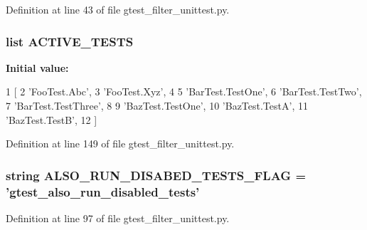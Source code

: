 \-Definition at line 43 of file gtest\-\_\-filter\-\_\-unittest.\-py.

\hypertarget{namespacegtest__filter__unittest_a10a0fc6f90e8342edb66ea225cee9164}{
\subsubsection[{\-A\-C\-T\-I\-V\-E\-\_\-\-T\-E\-S\-T\-S}]{\setlength{\rightskip}{0pt plus 5cm}list {\bf \-A\-C\-T\-I\-V\-E\-\_\-\-T\-E\-S\-T\-S}}}\label{d5/dea/namespacegtest__filter__unittest_a10a0fc6f90e8342edb66ea225cee9164}
{\bfseries \-Initial value\-:}
\begin{DoxyCode}
1 [
2     'FooTest.Abc',
3     'FooTest.Xyz',
4 
5     'BarTest.TestOne',
6     'BarTest.TestTwo',
7     'BarTest.TestThree',
8 
9     'BazTest.TestOne',
10     'BazTest.TestA',
11     'BazTest.TestB',
12     ]
\end{DoxyCode}


\-Definition at line 149 of file gtest\-\_\-filter\-\_\-unittest.\-py.

\hypertarget{namespacegtest__filter__unittest_a1faae9d17ac3e4505c49004bd8c29ace}{
\subsubsection[{\-A\-L\-S\-O\-\_\-\-R\-U\-N\-\_\-\-D\-I\-S\-A\-B\-E\-D\-\_\-\-T\-E\-S\-T\-S\-\_\-\-F\-L\-A\-G}]{\setlength{\rightskip}{0pt plus 5cm}string {\bf \-A\-L\-S\-O\-\_\-\-R\-U\-N\-\_\-\-D\-I\-S\-A\-B\-E\-D\-\_\-\-T\-E\-S\-T\-S\-\_\-\-F\-L\-A\-G} = 'gtest\-\_\-also\-\_\-run\-\_\-disabled\-\_\-tests'}}\label{d5/dea/namespacegtest__filter__unittest_a1faae9d17ac3e4505c49004bd8c29ace}


\-Definition at line 97 of file gtest\-\_\-filter\-\_\-unittest.\-py.

